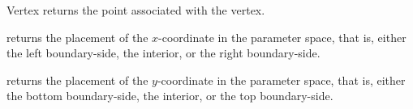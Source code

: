 \begin{ccRefClass}{Vertex}
    {returns the point associated with the vertex.
     }

    {returns the placement of the $x$-coordinate in the parameter space,
    that is, either the left boundary-side, the interior, or the right
    boundary-side.}

    {returns the placement of the $y$-coordinate in the parameter space,
    that is, either the bottom boundary-side, the interior, or the top
    boundary-side.}
     

\end{ccRefClass}

\ccRefPageEnd
